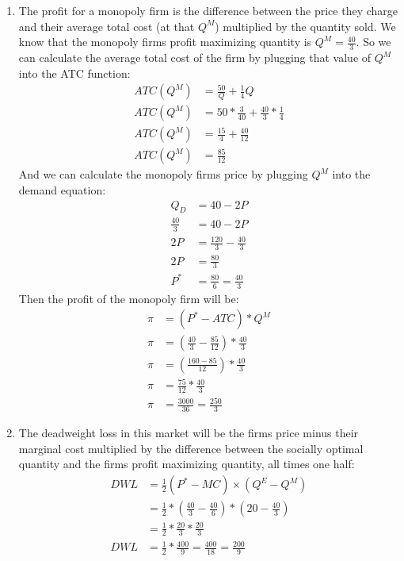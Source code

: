 \documentclass[12pt]{article}
\begin{document}
\begin{enumerate}[label = (\alph*)]
    \item The profit for a monopoly firm is the difference between the price they charge and their average total cost (at that $Q^M$) multiplied by the quantity sold. We know that the monopoly firms profit maximizing quantity is $Q^M = \frac{40}{3}$. So we can calculate the average total cost of the firm by plugging that value of $Q^M$ into the ATC function:
    \begin{align*}
        ATC(Q^M) &= \frac{50}{Q} + \frac{1}{4}Q \\
        ATC(Q^M) &= 50*\frac{3}{40} + \frac{40}{3}* \frac{1}{4} \\
        ATC(Q^M) &= \frac{15}{4} + \frac{40}{12} \\
        ATC(Q^M) &= \frac{85}{12}
    \end{align*}
    And we can calculate the monopoly firms price by plugging $Q^M$ into the demand equation:
    \begin{align*}
        Q_D &= 40 - 2P \\
        \frac{40}{3} & = 40 -2P \\
        2P &= \frac{120}{3} - \frac{40}{3} \\
        2P &= \frac{80}{3} \\
        P^* &= \frac{80}{6} = \frac{40}{3}
    \end{align*}
    Then the profit of the monopoly firm will be:
    \begin{align*}
        \pi &= (P^* - ATC) * Q^M \\
        \pi &= (\frac{40}{3} - \frac{85}{12})* \frac{40}{3} \\
        \pi &= (\frac{160 - 85}{12})*\frac{40}{3} \\
        \pi &= \frac{75}{12} * \frac{40}{3} \\
        \pi &= \frac{3000}{36} = \frac{250}{3}
    \end{align*}

    \item The deadweight loss in this market will be the firms price minus their marginal cost multiplied by the difference between the socially optimal quantity and the firms profit maximizing quantity, all times one half:
    \begin{align*}
        DWL &= \frac{1}{2}(P^* - MC) \times (Q^E - Q^M) \\
        &= \frac{1}{2}*(\frac{40}{3} - \frac{40}{6}) * (20 - \frac{40}{3}) \\
        &= \frac{1}{2}*\frac{20}{3} * \frac{20}{3} \\
        DWL &= \frac{1}{2}*\frac{400}{9} = \frac{400}{18} = \frac{200}{9}
    \end{align*}
\end{enumerate}
\end{document}
